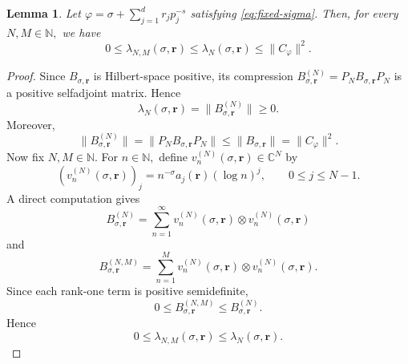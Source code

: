 \documentclass[12pt, reqno]{amsart}
\numberwithin{equation}{section}
\newtheorem{lemma}[theorem]{Lemma}
\begin{document}
\begin{lemma}
\label{lem:finite-section-lower-bound}
Let $\varphi=\sigma+\sum_{j=1}^{d}r_jp_j^{-s}$   satisfying  \eqref{eq:fixed-sigma}. Then, for every $N,M\in\mathbb{N},$ we have
\[
0\leq
\lambda_{N,M}(\sigma,\boldsymbol{r})
\leq
\lambda_N(\sigma,\boldsymbol{r})
\leq
\|C_{\varphi}\|^{2}.
\]
\end{lemma}
\begin{proof}
Since $B_{\sigma,\boldsymbol{r}}$ is Hilbert-space positive, its compression
$B_{\sigma,\boldsymbol{r}}^{(N)}
= P_NB_{\sigma,\boldsymbol{r}}P_N$
is a positive selfadjoint matrix. Hence
\[
\lambda_N(\sigma,\boldsymbol{r})
=
\|B_{\sigma,\boldsymbol{r}}^{(N)}\|
\geq 0.
\]
Moreover,
\[
\|B_{\sigma,\boldsymbol{r}}^{(N)}\|
=
\|P_NB_{\sigma,\boldsymbol{r}}P_N\|
\leq
\|B_{\sigma,\boldsymbol{r}}\|
=
\|C_{\varphi}\|^{2}.
\]
Now fix $N,M\in\mathbb{N}.$ For $n\in\mathbb{N},$ define
$v_n^{(N)}(\sigma,\boldsymbol{r})\in\mathbb{C}^{N}$
by
\[
(v_n^{(N)}(\sigma,\boldsymbol{r}))_j
=
n^{-\sigma}a_j(\boldsymbol{r})(\log n)^j,
\qquad
0\leq j\leq N-1.
\]
A direct computation gives
\[
B_{\sigma,\boldsymbol{r}}^{(N)}
=
\sum_{n=1}^{\infty}
v_n^{(N)}(\sigma,\boldsymbol{r})\otimes v_n^{(N)}(\sigma,\boldsymbol{r})
\]
and
\[
B_{\sigma,\boldsymbol{r}}^{(N,M)}
=
\sum_{n=1}^{M}
v_n^{(N)}(\sigma,\boldsymbol{r})\otimes v_n^{(N)}(\sigma,\boldsymbol{r}).
\]
Since each rank-one term is positive semidefinite,
\[
0\leq
B_{\sigma,\boldsymbol{r}}^{(N,M)}
\leq
B_{\sigma,\boldsymbol{r}}^{(N)}.
\] Hence
\[
0\leq
\lambda_{N,M}(\sigma,\boldsymbol{r})
\leq
\lambda_N(\sigma,\boldsymbol{r}).
\]
\end{proof}
\end{document}
